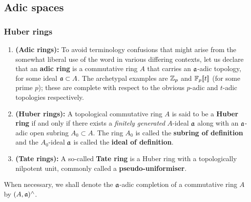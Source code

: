                 \begin{remark} \label{remark: adic_vs_zariski}
                    
                \end{remark}
        
        \subsection{Adic spaces}
            \subsubsection{Huber rings}
                \begin{definition} \label{def: huber_rings}
                    \noindent
                    \begin{enumerate}
                        \item \textbf{(Adic rings):} To avoid terminology confusions that might arise from the somewhat liberal use of the word  in various differing contexts, let us declare that an \textbf{adic ring} is a commutative ring $A$ that carries an $\mathfrak{a}$-adic topology, for some ideal $\mathfrak{a} \subset A$. The archetypal examples are $\mathbb{Z}_p$ and $\mathbb{F}_p[\![t]\!]$ (for some prime $p$); these are complete with respect to the obvious $p$-adic and $t$-adic topologies respectively.
                        \item \textbf{(Huber rings):} A topological commutative ring $A$ is said to be a \textbf{Huber ring} if and only if there exists a \textit{finitely generated} $A$-ideal $\mathfrak{a}$ along with an $\mathfrak{a}$-adic open subring $A_0 \subset A$. The ring $A_0$ is called the \textbf{subring of definition} and the $A_0$-ideal $\mathfrak{a}$ is called the \textbf{ideal of definition}.
                        \item \textbf{(Tate rings):} A so-called \textbf{Tate ring} is a Huber ring with a topologically nilpotent unit, commonly called a \textbf{pseudo-uniformiser}. 
                    \end{enumerate}
                \end{definition}
                
                \begin{convention} \label{conv: adic_completion_of_rings}
                    When necessary, we shall denote the $\mathfrak{a}$-adic completion of a commutative ring $A$ by $(A, \mathfrak{a})^{\wedge}$. 
                \end{convention}
                
